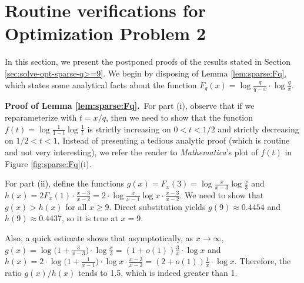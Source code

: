 \documentclass[11pt]{article}
\begin{document}
\appendix

\section{Routine verifications for Optimization Problem 2}

In this section, we present the postponed proofs of the results stated
in Section \ref{sec:solve-opt-sparse-q>=9}.  We begin by disposing of
Lemma \ref{lem:sparse:Fq}, which states some analytical facts about
the function $F_q(x) =\log \frac{q}{q-x} \cdot \log \frac{q}{x}$.


\vspace{3mm}


\noindent \textbf{Proof of Lemma \ref{lem:sparse:Fq}.}\, For part (i),
observe that if we reparameterize with $t = x/q$, then we need to show
that the function $f(t) = \log \frac{1}{1-t} \log \frac{1}{t}$ is
strictly increasing on $0 < t < 1/2$ and strictly decreasing on $1/2 <
t < 1$.  Instead of presenting a tedious analytic proof (which is
routine and not very interesting), we refer the reader to
\emph{Mathematica}'s plot of $f(t)$ in Figure \ref{fig:sparse:Fq}(i).

For part (ii), define the functions $g(x) = F_x(3) = \log
\frac{x}{x-3} \log \frac{x}{3}$ and $h(x) = 2F_x(1) \cdot
\frac{x-3}{x-2} = 2 \cdot \log \frac{x}{x-1} \log x \cdot
\frac{x-3}{x-2}$.  We need to show that $g(x) > h(x)$ for all $x \geq
9$.  Direct substitution yields $g(9) \approx 0.4454$ and $h(9)
\approx 0.4437$, so it is true at $x=9$.

Also, a quick estimate shows that asymptotically, as $x \rightarrow
\infty$, $g(x) = \log \big(1 + \frac{3}{x-3}\big)\cdot \log \frac{x}{3} =
(1+o(1)) \frac{3}{x} \cdot \log x$ and $h(x) = 2 \cdot \log \big(1 +
\frac{1}{x-1}\big)\cdot \log x \cdot \frac{x-3}{x-2} = (2+o(1)) 
\frac{1}{x} \cdot \log x$.  Therefore, the ratio $g(x) / h(x)$ tends
to 1.5, which is indeed greater than 1.
\end{document}
